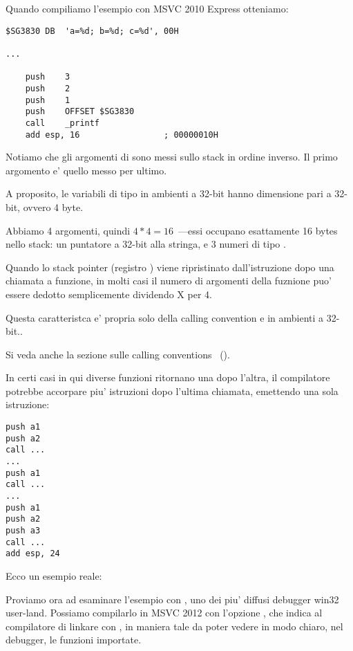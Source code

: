 

Quando compiliamo l'esempio con MSVC 2010 Express otteniamo:

\begin{lstlisting}
$SG3830	DB	'a=%d; b=%d; c=%d', 00H

...

	push	3
	push	2
	push	1
	push	OFFSET $SG3830
	call	_printf
	add	esp, 16					; 00000010H
\end{lstlisting}

Notiamo che gli argomenti di \printf sono messi sullo stack in ordine inverso. Il primo argomento e' quello messo per ultimo.

A proposito, le variabili di tipo \Tint in ambienti a 32-bit hanno dimensione pari a 32-bit, ovvero 4 byte.

Abbiamo 4 argomenti, quindi $4*4 = 16$~---essi occupano esattamente 16 bytes nello stack: un puntatore a 32-bit alla stringa,  e 3 numeri di tipo \Tint.

Quando lo \gls{stack pointer} (registro \ESP) viene ripristinato dall'istruzione 
dopo una chiamata a funzione, in molti casi il numero di argomenti della fuznione puo' essere dedotto semplicemente dividendo X per 4.

Questa caratteristca  e' propria solo della calling convention  e in ambienti a 32-bit..

Si veda anche la sezione sulle calling conventions ~().

In certi casi in qui diverse funzioni ritornano una dopo l'altra, il compilatore potrebbe accorpare piu' istruzioni  
dopo l'ultima chiamata, emettendo una sola istruzione:

\begin{lstlisting}
push a1
push a2
call ...
...
push a1
call ...
...
push a1
push a2
push a3
call ...
add esp, 24
\end{lstlisting}

Ecco un esempio reale:



\clearpage
{}
\myindex{\olly}

Proviamo ora ad esaminare l'esempio con \olly, uno dei piu' diffusi debugger win32 user-land.
Possiamo compilarlo in MSVC 2012 con l'opzione , che indica al compilatore di linkare con ,
in maniera tale da poter vedere in modo chiaro, nel debugger, le funzioni importate.


